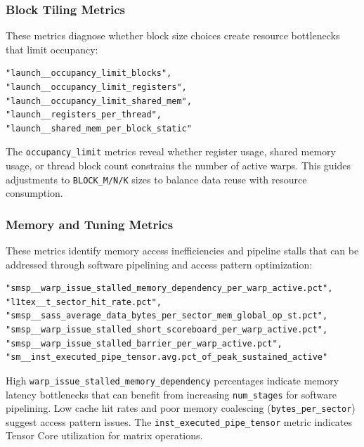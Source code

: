 \subsubsection{Block Tiling Metrics}

These metrics diagnose whether block size choices create resource bottlenecks that limit occupancy:

\begin{mdframed}[linewidth=1pt, linecolor=black, backgroundcolor=gray!5]
\begin{lstlisting}
"launch__occupancy_limit_blocks",
"launch__occupancy_limit_registers",
"launch__occupancy_limit_shared_mem",
"launch__registers_per_thread",
"launch__shared_mem_per_block_static"
\end{lstlisting}
\end{mdframed}

The \texttt{occupancy\_limit} metrics reveal whether register usage, shared memory usage, or thread block count constrains the number of active warps. This guides adjustments to \texttt{BLOCK\_M/N/K} sizes to balance data reuse with resource consumption.

\subsubsection{Memory and Tuning Metrics}

These metrics identify memory access inefficiencies and pipeline stalls that can be addressed through software pipelining and access pattern optimization:

\begin{mdframed}[linewidth=1pt, linecolor=black, backgroundcolor=gray!5]
\begin{lstlisting}
"smsp__warp_issue_stalled_memory_dependency_per_warp_active.pct",
"l1tex__t_sector_hit_rate.pct",
"smsp__sass_average_data_bytes_per_sector_mem_global_op_st.pct",
"smsp__warp_issue_stalled_short_scoreboard_per_warp_active.pct",
"smsp__warp_issue_stalled_barrier_per_warp_active.pct",
"sm__inst_executed_pipe_tensor.avg.pct_of_peak_sustained_active"
\end{lstlisting}
\end{mdframed}

High \texttt{warp\_issue\_stalled\_memory\_dependency} percentages indicate memory latency bottlenecks that can benefit from increasing \texttt{num\_stages} for software pipelining. Low cache hit rates and poor memory coalescing (\texttt{bytes\_per\_sector}) suggest access pattern issues. The \texttt{inst\_executed\_pipe\_tensor} metric indicates Tensor Core utilization for matrix operations.

